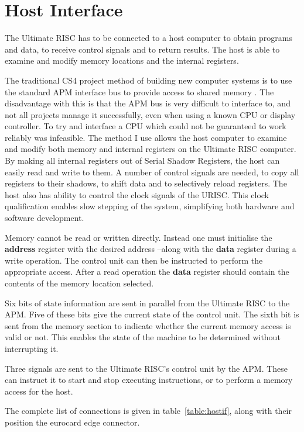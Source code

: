 \chapter{Host Interface}

The Ultimate RISC has to be connected to a host computer to obtain 
programs and data, to receive control signals and to return 
results. The host is able to examine and modify memory 
locations and the internal registers.

The traditional CS4 project method of building new computer systems 
is to use the standard APM interface bus to provide access to shared
memory . The disadvantage with this is that the APM 
bus is very difficult to interface to, and not all projects manage it 
successfully, even when using a known CPU or display controller. 
 To try and interface a CPU which could not be guaranteed to work reliably was infeasible.
The method I  use  allows the host 
computer to examine and modify both memory and internal 
registers on the Ultimate RISC computer. 
By making  all internal registers out of Serial Shadow Registers,
 the host can easily read and write to them. A number of control 
signals are needed, to copy all registers to their shadows, to 
shift data and to selectively reload registers.
The host also has ability to control the clock signals of the URISC.
This clock qualification enables slow stepping of the system, simplifying both
hardware and software development.

 Memory cannot be read or written directly. Instead one 
must initialise the {\bf address} register with the desired address --along with  the {\bf data} register during a write operation. The control unit can then be instructed
to perform the appropriate access. After a read operation the {\bf data} register
should contain the contents of the memory location selected.

Six bits of  state information are sent in parallel from the Ultimate RISC to the APM.
Five of these bits give the current state of the control unit. 
The sixth bit is sent from the memory section to indicate whether the current memory access is valid or not.
This enables the state of the machine to be 
determined without interrupting it.

Three signals are sent to the Ultimate RISC's control unit by the APM.
These can instruct it to start and stop executing instructions, or to perform a memory access for the host.

The complete list of connections is given in  table~\ref{table:hostif}, along 
with their position the eurocard edge connector.

